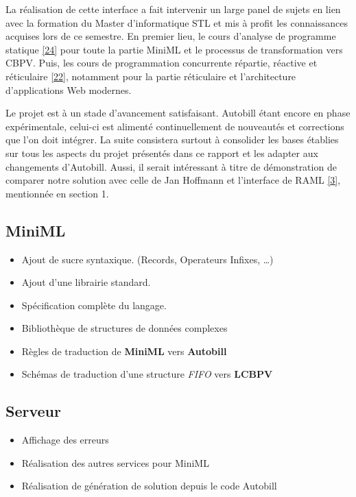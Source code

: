 \documentclass[12pt]{article}
\begin{document}
La réalisation de cette interface a fait intervenir un large panel de
sujets en lien avec la formation du Master d'informatique STL et mis à
profit les connaissances acquises lors de ce semestre. En premier lieu,
le cours d'analyse de programme statique
\protect\hyperlink{ref-APS}{{[}24{]}} pour toute la partie MiniML et le
processus de transformation vers CBPV. Puis, les cours de programmation
concurrente répartie, réactive et réticulaire
\protect\hyperlink{ref-PC3R}{{[}22{]}}, notamment pour la partie
réticulaire et l'architecture d'applications Web modernes.

Le projet est à un stade d'avancement satisfaisant. Autobill étant
encore en phase expérimentale, celui-ci est alimenté continuellement de
nouveautés et corrections que l'on doit intégrer. La suite consistera
surtout à consolider les bases établies sur tous les aspects du projet
présentés dans ce rapport et les adapter aux changements d'Autobill.
Aussi, il serait intéressant à titre de démonstration de comparer notre
solution avec celle de Jan Hoffmann et l'interface de RAML
\protect\hyperlink{ref-RAML}{{[}3{]}}, mentionnée en section 1.

\hypertarget{miniml-1}{%
  \subsection{MiniML}\label{miniml-1}}

\begin{itemize}
  \tightlist
  \item
        Ajout de sucre syntaxique. (Records, Operateurs Infixes, \ldots)
  \item
        Ajout d'une librairie standard.
  \item
        Spécification complète du langage.
  \item
        Bibliothèque de structures de données complexes
  \item
        Règles de traduction de \textbf{MiniML} vers \textbf{Autobill}
  \item
        Schémas de traduction d'une structure \emph{FIFO} vers \textbf{LCBPV}
\end{itemize}

\hypertarget{serveur}{%
  \subsection{Serveur}\label{serveur}}

\begin{itemize}
  \tightlist
  \item
        Affichage des erreurs
  \item
        Réalisation des autres services pour MiniML
  \item
        Réalisation de génération de solution depuis le code Autobill
\end{itemize}
\end{document}
